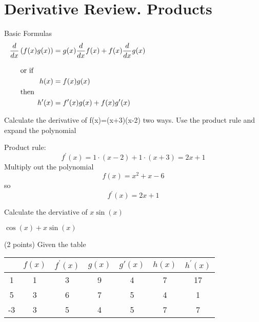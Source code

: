 \section*{Derivative Review. Products}
Basic Formulas
\begin{equation}
  \begin{aligned}
    \frac{d}{dx} \left(f(x)g(x)\right) &= g(x)\frac{d}{dx} f(x)+f(x)\frac{d}{dx} g(x) \\
    \noalign{\vspace{1 em}or if}
    h(x) &= f(x)g(x) \\
    \noalign{then}
    h'(x) &= f^\prime(x)g(x)+f(x)g^\prime(x) \\
  \end{aligned}
\end{equation}

\begin{questions}
\question
Calculate the derivative of f(x)=(x+3)(x-2) two ways. Use the product rule and expand the polynomial
\begin{solution}[1.5in]
  Product rule:
  $$f^\prime(x)=1\cdot(x-2)+1\cdot(x+3) = 2x+1$$
  Multiply out the polynomial
  $$f(x)=x^2+x-6$$
  so
  $$f^\prime(x)=2x+1$$
\end{solution}
\question
Calculate the derviative of $x\sin(x)$
\begin{solution}[1.5in]
  $\cos(x)+x\sin(x)$
\end{solution}
\question
(2 points) Given the table

  \begin{tabular}{c|cccccc}
    \hline
    & $f(x)$ & $f^\prime(x)$ & $g(x)$ & $g'(x)$ & $h(x)$ & $h^\prime(x)$ \\
    \hline
    1& 1 & 3 & 9 & 4 & 7 & 17 \\
    \hline
    5 &3 & 6 & 7 & 5 & 4 & 1 \\
    \hline
    -3 &3 & 5 & 4 & 5 & 7& 7  \\
    \hline
  \end{tabular}
  \vspace{1em}
\end{questions}
